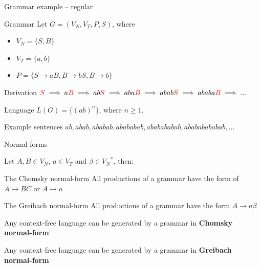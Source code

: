 \documentclass{beamer}
\begin{document}
\begin{frame}{Grammar example -- regular}
	
	\begin{block}{Grammar}
		Let $G = (V_N, V_T, P, S)$, where 
		\begin{itemize}
			\item $V_N = \{S, B\}$
			\item $V_T = \{a,b\}$
			\item $P = \{S \rightarrow aB, B \rightarrow bS, B \rightarrow b\}$
		\end{itemize}
	\end{block}
	
	\begin{block}{Derivation}
		$\textcolor{red}{S} \implies a\textcolor{red}{B} \implies ab\textcolor{red}{S} \implies aba\textcolor{red}{B} \implies abab\textcolor{red}{S} \implies ababa\textcolor{red}{B} \implies ...$
	\end{block}
	
	\begin{block}{Language}
		$L(G) = \{(ab)^n\}$, where $n\geq 1$.
	\end{block}
	
	\begin{exampleblock}{Example sentences}
		$ab, abab, ababab, abababab, ababababab, abababababab, ...$
	\end{exampleblock}
	
\end{frame}


\begin{frame}{Normal forms}

Let $A, B\in V_N$, $a\in V_T$ and $\beta\in {V_N}^*$, then:

\begin{block}{The Chomsky normal-form}
	All productions of a grammar have the form of $A \rightarrow BC$ or $A \rightarrow a$
\end{block}

\begin{block}{The Greibach normal-form}
	All productions of a grammar have the form $A \rightarrow a\beta$
\end{block}

\begin{theorem}
	Any context-free language can be generated by a grammar in \textbf{Chomsky normal-form}
\end{theorem}

\begin{theorem}
	Any context-free language can be generated by a grammar in \textbf{Greibach normal-form}
\end{theorem}

\end{frame}
\end{document}

